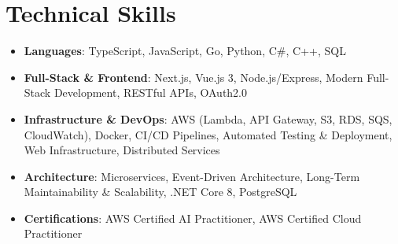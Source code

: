 \documentclass[letterpaper,11pt]{article}
\newcommand{\resumeSubHeadingListStart}{\begin{itemize}[leftmargin=*]}
\newcommand{\resumeSubHeadingListEnd}{\end{itemize}}
\begin{document}
%
\section{Technical Skills}
 \resumeSubHeadingListStart
   \item{
     \textbf{Languages}{: TypeScript, JavaScript, Go, Python, C\#, C++, SQL}
   }
   \item{
     \textbf{Full-Stack \& Frontend}{: Next.js, Vue.js 3, Node.js/Express, Modern Full-Stack Development, RESTful APIs, OAuth2.0}
   }
   \item{
     \textbf{Infrastructure \& DevOps}{: AWS (Lambda, API Gateway, S3, RDS, SQS, CloudWatch), Docker, CI/CD Pipelines, Automated Testing \& Deployment, Web Infrastructure, Distributed Services}
   }
   \item{
     \textbf{Architecture}{: Microservices, Event-Driven Architecture, Long-Term Maintainability \& Scalability, .NET Core 8, PostgreSQL}
   }
   \item{
     \textbf{Certifications}{: AWS Certified AI Practitioner, AWS Certified Cloud Practitioner}
   }
 \resumeSubHeadingListEnd


\end{document}
